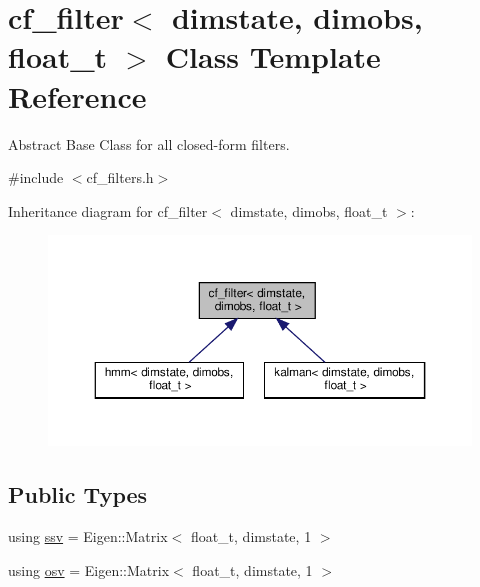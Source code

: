 \hypertarget{classcf__filter}{}\section{cf\+\_\+filter$<$ dimstate, dimobs, float\+\_\+t $>$ Class Template Reference}
\label{classcf__filter}


Abstract Base Class for all closed-\/form filters.  




{\ttfamily \#include $<$cf\+\_\+filters.\+h$>$}



Inheritance diagram for cf\+\_\+filter$<$ dimstate, dimobs, float\+\_\+t $>$\+:\nopagebreak
\begin{figure}[H]
\begin{center}
\leavevmode
\includegraphics[width=350pt]{classcf__filter__inherit__graph}
\end{center}
\end{figure}
\subsection*{Public Types}
\begin{DoxyCompactItemize}
\item 
using \hyperlink{classcf__filter_ad4bce534d6b7a494dae851846037c94b}{ssv} = Eigen\+::\+Matrix$<$ float\+\_\+t, dimstate, 1 $>$
\item 
using \hyperlink{classcf__filter_a91d9961b2ecd202b1400c401434b392d}{osv} = Eigen\+::\+Matrix$<$ float\+\_\+t, dimstate, 1 $>$
\end{DoxyCompactItemize}
